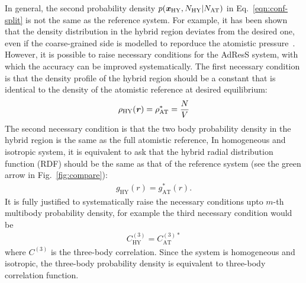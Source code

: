 \documentclass[epjST]{svjour}
\newcommand{\vect}[1]{\textbf{\textit{#1}}}
\newcommand{\AT}[0]{\textrm{AT}}
\newcommand{\HY}[0]{\textrm{HY}}
\begin{document}
In general, the second probability density $p(\vect x_\HY, N_\HY\vert N_\AT)$ in Eq.~\eqref{eqn:conf-split} 
is not the same as the reference system.  For example, it has been
shown that the density distribution in the hybrid region deviates from
the desired one, even if the coarse-grained side is modelled to
reporduce the atomistic pressure~\cite{poblete2010coupling}.  However,
it is possible to raise necessary conditions
for the AdResS system, with which the accuracy can be improved
systematically.
The first necessary
condition is that the density profile of the hybrid region should be a
constant that is identical to the density of the atomistic reference
at desired equilibrium:
\begin{align}\label{eqn:necessary-1st}
  \rho_\HY(\vect r) = \rho_\AT^\ast = \frac NV
\end{align}
The second necessary condition is that the two body probability
density in the hybrid region is the same as the full atomistic
reference, In homogeneous and isotropic system, it is equivalent to
ask that the hybrid radial distribution function (RDF) should be the
same as that of the reference system (see the green arrow in Fig.~\ref{fig:compare}):
\begin{align}\label{eqn:necessary-2nd}
  g_\HY(r) = g^\ast_\AT(r).
\end{align}
It is fully justified to systematically raise the necessary conditions
upto $m$-th multibody probability density, for example the third necessary condition would be
\begin{align}
  C^{(3)}_\HY = C^{(3)\ast}_\AT
\end{align}
where $C^{(3)}$ is the three-body correlation.
Since the system is homogeneous
and isotropic, the three-body probability density is equivalent to
three-body correlation function. 
\end{document}
